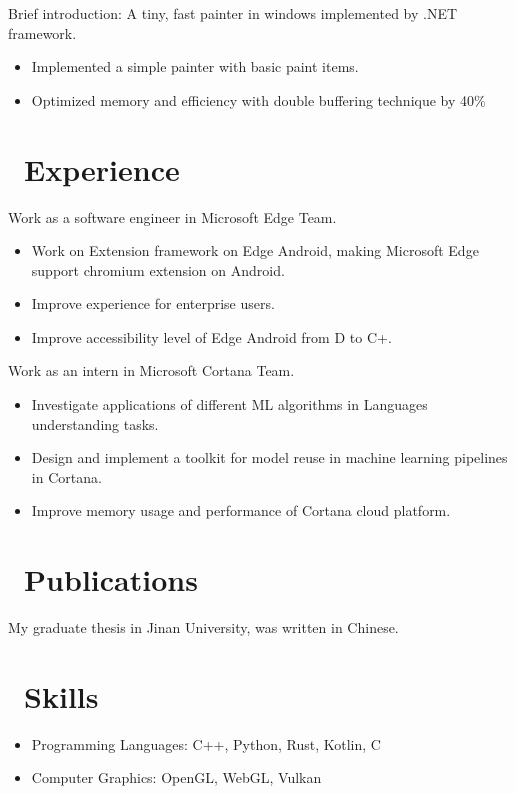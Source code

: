 \documentclass{resume}
\begin{document}
Brief introduction: A tiny, fast painter in windows implemented by .NET framework.
\begin{itemize}
  \item Implemented a simple painter with basic paint items.
  \item Optimized memory and efficiency with double buffering technique by 40\%
\end{itemize}

\section{\faUsers\ Experience}

Work as a software engineer in Microsoft Edge Team.
\begin{itemize}
    \item Work on Extension framework on Edge Android, making Microsoft Edge support chromium extension on Android.
    \item Improve experience for enterprise users.
    \item Improve accessibility level of Edge Android from D to C+.
\end{itemize}

Work as an intern in Microsoft Cortana Team.
\begin{itemize}
    \item Investigate applications of different ML algorithms in Languages understanding tasks.
    \item Design and implement a toolkit for model reuse in machine learning pipelines in Cortana.
    \item Improve memory usage and performance of Cortana cloud platform.
\end{itemize}

\section{\faCogs\ Publications}
My graduate thesis in Jinan University, was written in Chinese.

\section{\faCogs\ Skills}
\begin{itemize}[parsep=0.5ex]
  \item Programming Languages: C++, Python, Rust, Kotlin, C
  \item Computer Graphics: OpenGL, WebGL, Vulkan
\end{itemize}
\end{document}
